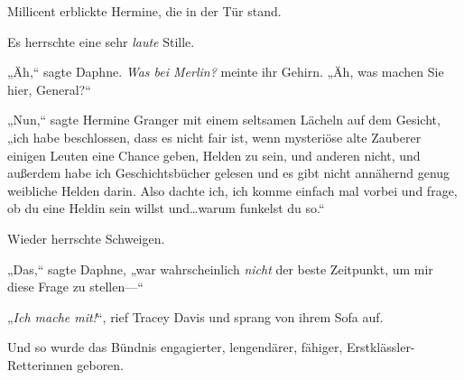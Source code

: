 Millicent erblickte Hermine, die in der Tür stand.

Es herrschte eine sehr \emph{laute} Stille.

„Äh,“ sagte Daphne. \emph{Was bei Merlin?} meinte ihr Gehirn. „Äh, was machen Sie hier, General?“

„Nun,“ sagte Hermine Granger mit einem seltsamen Lächeln auf dem Gesicht, „ich habe beschlossen, dass es nicht fair ist, wenn mysteriöse alte Zauberer einigen Leuten eine Chance geben, Helden zu sein, und anderen nicht, und außerdem habe ich Geschichtsbücher gelesen und es gibt nicht annähernd genug weibliche Helden darin. Also dachte ich, ich komme einfach mal vorbei und frage, ob du eine Heldin sein willst und…warum funkelst du so.“

Wieder herrschte Schweigen.

„Das,“ sagte Daphne, „war wahrscheinlich \emph{nicht} der beste Zeitpunkt, um mir diese Frage zu stellen—“

„\emph{Ich mache mit!}“, rief Tracey Davis und sprang von ihrem Sofa auf.

\later

Und so wurde das Bündnis engagierter, lengendärer, fähiger, Erstklässler-Retterinnen geboren.%
